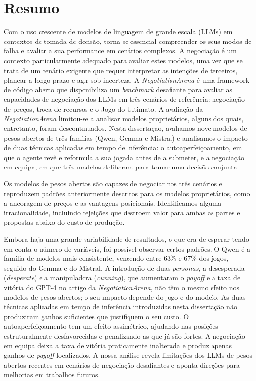 
\chapter*{Resumo}
%

Com o uso crescente de modelos de linguagem de grande escala (LLMs) em contextos de tomada de decisão, torna-se essencial compreender os seus modos de falha e avaliar a sua performance em cenários complexos. A negociação é um contexto particularmente adequado para avaliar estes modelos, uma vez que se trata de um cenário exigente que requer interpretar as intenções de terceiros, planear a longo prazo e agir sob incerteza. A \textit{NegotiationArena} é uma framework de código aberto que disponibiliza um \textit{benchmark} desafiante para avaliar as capacidades de negociação dos LLMs em três cenários de referência: negociação de preços, troca de recursos e o Jogo do Ultimato. A avaliação da \textit{NegotiationArena} limitou-se a analisar modelos proprietários, alguns dos quais, entretanto, foram descontinuados. Nesta dissertação, avaliamos nove modelos de pesos abertos de três famílias (Qwen, Gemma e Mistral) e analisamos o impacto de duas técnicas aplicadas em tempo de inferência: o autoaperfeiçoamento, em que o agente revê e reformula a sua jogada antes de a submeter, e a negociação em equipa, em que três modelos deliberam para tomar uma decisão conjunta.

Os modelos de pesos abertos são capazes de negociar nos três cenários e reproduzem padrões anteriormente descritos para os modelos proprietários, como a ancoragem de preços e as vantagens posicionais. Identificamos alguma irracionalidade, incluindo rejeições que destroem valor para ambas as partes e propostas abaixo do custo de produção.

Embora haja uma grande variabilidade de resultados, o que era de esperar tendo em conta o número de variáveis, foi possível observar certos padrões. O Qwen é a família de modelos mais consistente, vencendo entre 63\% e 67\% dos jogos, seguido do Gemma e do Mistral. A introdução de duas \textit{personas}, a desesperada (\textit{desperate}) e a manipuladora (\textit{cunning}), que aumentaram o \textit{payoff} e a taxa de vitória do GPT-4 no artigo da \textit{NegotiationArena}, não têm o mesmo efeito nos modelos de pesos abertos; o seu impacto depende do jogo e do modelo. As duas técnicas aplicadas em tempo de inferência introduzidas nesta dissertação não produziram ganhos suficientes que justifiquem o seu custo. O autoaperfeiçoamento tem um efeito assimétrico, ajudando nas posições estruturalmente desfavorecidas e penalizando as que já são fortes. A negociação em equipa deixa a taxa de vitória praticamente inalterada e produz apenas ganhos de \textit{payoff} localizados. A nossa análise revela limitações dos LLMs de pesos abertos recentes em cenários de negociação desafiantes e aponta direções para melhorias em trabalhos futuros.

